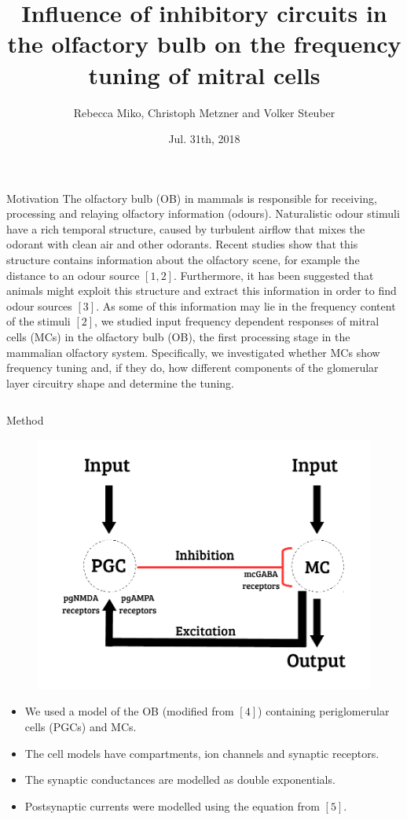 \documentclass[final,hyperref={pdfpagelabels=false}]{beamer}
\title{Influence of inhibitory circuits in the olfactory bulb on the frequency tuning of mitral cells}
\author[Miko]{Rebecca Miko, Christoph Metzner and Volker Steuber}
\institute{University of Hertfordshire, AL10 9AB, UK}
\date{Jul. 31th, 2018}
\begin{document}
\begin{frame}{} 
  \begin{block}{Motivation}
    The olfactory bulb (OB) in mammals is responsible for receiving, processing and relaying olfactory information (odours). 
    Naturalistic odour stimuli have a rich temporal structure, caused by turbulent airflow that mixes the odorant with clean air and other odorants. 
    Recent studies show that this structure contains information about the olfactory scene, for example the distance to an odour source $[1,2]$. 
    Furthermore, it has been suggested that animals might exploit this structure and extract this information in order to find odour sources $[3]$. 
    As some of this information may lie in the frequency content of the stimuli $[2]$, we studied input frequency dependent responses of mitral cells (MCs) in the olfactory bulb (OB), the first processing stage in the mammalian olfactory system.
    Specifically, we investigated whether MCs show frequency tuning and, if they do, how different components of the glomerular layer circuitry shape and determine the tuning.
  \end{block}

  \begin{columns}[t]
    \begin{column}{.48\linewidth}
      \begin{block}{Method} 
      	\begin{figure}
      		\center
      		\includegraphics[scale=0.6]{images/Circuit_Diagram}
      		\end{figure}
      		\begin{itemize}
      			\item We used a model of the OB (modified from $[4]$) containing periglomerular cells (PGCs) and MCs.
      			\item The cell models have compartments, ion channels and synaptic receptors.
      			\item The synaptic conductances are modelled as double exponentials.
      			\item Postsynaptic currents were modelled using the equation from $[5]$.
      		\end{itemize}
      	      	

\end{block}
\end{column}
\end{columns}
\end{frame}
\end{document}
